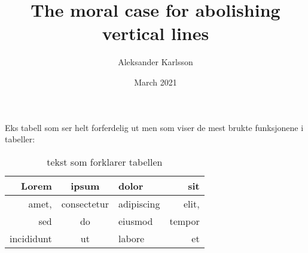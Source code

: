 \documentclass{article}
\title{The moral case for abolishing vertical lines}
\author{Aleksander Karlsson}
\date{March 2021}
\begin{document}
\maketitle


\noindent Eks tabell som ser helt forferdelig ut men som viser de mest brukte funksjonene i tabeller:
\begin{table}[h!]
    \centering
    \caption{tekst som forklarer tabellen}
    \label{tab:my_label}
    \vspace{2mm}
    \begin{tabular}{|rc|l||r} %
        \hline
        \textbf{Lorem} & \textbf{ipsum} & \textbf{dolor} & \textbf{sit} \\ \hline
        amet,          & consectetur    & adipiscing     & elit, \\ 
        sed            & do             & eiusmod        & tempor \\ \hline\hline %
        incididunt     & ut             & labore         & et \\
    \end{tabular}
\end{table}
\end{document}
